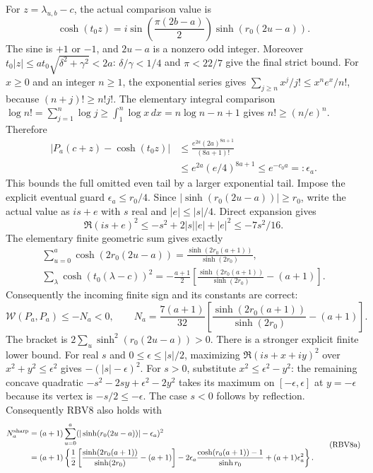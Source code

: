\documentclass[11pt,a4paper]{article}
\begin{document}
For $z=\lambda_{u,b}-c$, the actual comparison value is
\[
\cosh(t_0z)=i\sin\!\left(\frac{\pi(2b-a)}2\right)
                   \sinh(r_0(2u-a)).\tag{RBV4}
\]
The sine is $+1$ or $-1$, and $2u-a$ is a nonzero odd integer.
Moreover
$t_0|z|\le at_0\sqrt{\delta^2+\gamma^2}<2a$:
$\delta/\gamma<1/4$ and $\pi<22/7$ give the final strict bound.
For $x\ge0$ and an integer $n\ge1$, the exponential series gives
$\sum_{j\ge n}x^j/j!\le x^ne^x/n!$, because
$(n+j)!\ge n!j!$. The elementary integral comparison
$\log n!=\sum_{j=1}^n\log j\ge\int_1^n\log x\,dx
=n\log n-n+1$ gives $n!\ge(n/e)^n$. Therefore
\[
\begin{split}
|P_a(c+z)-\cosh(t_0z)|
&\le\frac{e^{2a}(2a)^{8a+1}}{(8a+1)!}\\
&\le e^{2a}(e/4)^{8a+1}\le e^{-c_0a}=:\epsilon_a.
\end{split}\tag{RBV5}
\]
This bounds the full omitted even tail by a larger exponential tail.
Impose the explicit eventual guard $\epsilon_a\le r_0/4$.
Since $|\sinh(r_0(2u-a))|\ge r_0$, write the actual value as
$is+e$ with $s$ real and $|e|\le|s|/4$. Direct expansion gives
\[
\Re(is+e)^2\le-s^2+2|s||e|+|e|^2\le-7s^2/16.
\tag{RBV6}
\]
The elementary finite geometric sum gives exactly
\[
\begin{gathered}
\sum_{u=0}^a\cosh(2r_0(2u-a))
=\frac{\sinh(2r_0(a+1))}{\sinh(2r_0)},\\
\sum_{\lambda}\cosh(t_0(\lambda-c))^2
=-\frac{a+1}{2}
 \left[\frac{\sinh(2r_0(a+1))}{\sinh(2r_0)}-(a+1)\right].
\end{gathered}\tag{RBV7}
\]
Consequently the incoming finite sign and its constants are correct:
\[
\boxed{\mathcal W(P_a,P_a)\le-N_a<0,\qquad
N_a=\frac{7(a+1)}{32}
\left[\frac{\sinh(2r_0(a+1))}{\sinh(2r_0)}-(a+1)\right].}
\tag{RBV8}
\]
The bracket is $2\sum_u\sinh^2(r_0(2u-a))>0$.
There is a stronger explicit finite lower bound. For real $s$ and
$0\le\epsilon\le|s|/2$, maximizing $\Re(is+x+iy)^2$ over
$x^2+y^2\le\epsilon^2$ gives $-(|s|-\epsilon)^2$.
For $s>0$, substitute $x^2\le\epsilon^2-y^2$: the remaining
concave quadratic $-s^2-2sy+\epsilon^2-2y^2$ takes its maximum
on $[-\epsilon,\epsilon]$ at $y=-\epsilon$ because its vertex
is $-s/2\le-\epsilon$. The case $s<0$ follows by reflection.
Consequently RBV8 also holds with
\[
\begin{split}
N_a^{\rm sharp}
&=(a+1)\sum_{u=0}^a
 (|\sinh(r_0(2u-a))|-\epsilon_a)^2\\
&=(a+1)\left\{\frac12
 \left[\frac{\sinh(2r_0(a+1))}{\sinh(2r_0)}-(a+1)\right]
-2\epsilon_a\frac{\cosh(r_0(a+1))-1}{\sinh r_0}
 +(a+1)\epsilon_a^2\right\}.
\end{split}\tag{RBV8a}
\]
\end{document}

